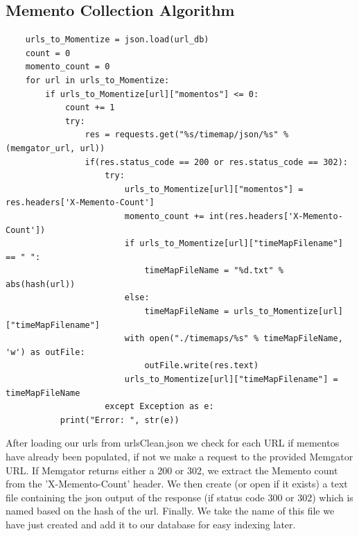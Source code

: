 \documentclass[11pt]{article}
\begin{document}
	\subsection{Memento Collection Algorithm }
	\begin{lstlisting}
	urls_to_Momentize = json.load(url_db)
	count = 0
	momento_count = 0
	for url in urls_to_Momentize:
	    if urls_to_Momentize[url]["momentos"] <= 0:
	        count += 1
	        try:
	            res = requests.get("%s/timemap/json/%s" % (memgator_url, url))
	            if(res.status_code == 200 or res.status_code == 302):
	                try:
	                    urls_to_Momentize[url]["momentos"] = res.headers['X-Memento-Count']
	                    momento_count += int(res.headers['X-Memento-Count'])
	                    if urls_to_Momentize[url]["timeMapFilename"] == " ":
	                        timeMapFileName = "%d.txt" % abs(hash(url))
	                    else:
	                        timeMapFileName = urls_to_Momentize[url]["timeMapFilename"]
 	                    with open("./timemaps/%s" % timeMapFileName, 'w') as outFile:
	                        outFile.write(res.text)
	                    urls_to_Momentize[url]["timeMapFilename"] = timeMapFileName
	                except Exception as e:
	       print("Error: ", str(e))
	\end{lstlisting}
	\hspace{10mm} After loading our urls from urlsClean.json we check for each URL if mementos have already been populated, if not we make a request to the provided Memgator URL. If Memgator returns either a 200 or 302, we extract the Memento count from the 'X-Memento-Count' header.  We then create (or open if it exists) a text file  containing the json output of the response (if status code 300 or 302) which is named based on the hash of the url. Finally. We take the name of this file we have just created and add it to our database for easy indexing later. 
\end{document}
